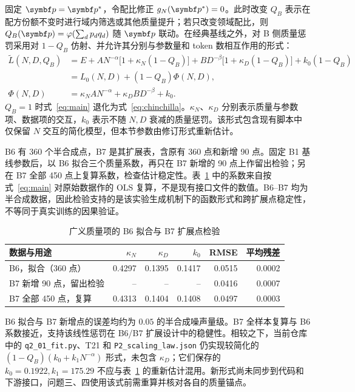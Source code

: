 固定 $\bp=\bp^*$，令配比修正 $g_N(\bp^*)=0$。此时改变 $Q_B$ 表示在配方份额不变时进行域内筛选或其他质量提升；若只改变领域配比，则 $Q_B(\bp)=\varphi(\sum_dp_dq_d)$ 随 $\bp$ 联动。在经典基线之外，对 B 侧质量惩罚采用对 $1-Q_B$ 仿射、并允许其分别与参数量和 token 数相互作用的形式：
\begin{equation}
\boxed{
\begin{aligned}
\widetilde L(N,D,Q_B)
&=E+AN^{-\alpha}\bigl[1+\kappa_N(1-Q_B)\bigr]
 +BD^{-\beta}\bigl[1+\kappa_D(1-Q_B)\bigr]+k_0(1-Q_B)\\
&=L_0(N,D)+(1-Q_B)\Phi(N,D),\\
\Phi(N,D)&=\kappa_NAN^{-\alpha}+\kappa_DBD^{-\beta}+k_0.
\end{aligned}}
\label{eq:main}
\end{equation}
$Q_B=1$ 时式~\eqref{eq:main} 退化为式~\eqref{eq:chinchilla}。$\kappa_N$、$\kappa_D$ 分别表示质量与参数项、数据项的交互，$k_0$ 表示不随 $N,D$ 衰减的质量惩罚。该形式包含现有脚本中仅保留 $N$ 交互的简化模型，但本节参数由修订形式重新估计。

B6 有 360 个半合成点，B7 是其扩展表，含原有 360 点和新增 90 点。固定 B1 基线参数后，以 B6 拟合三个质量系数，再只在 B7 新增的 90 点上作留出检验；另在 B7 全部 450 点上复算系数，检查估计稳定性。表~\ref{tab:q2_general_fit} 中的系数来自按式~\eqref{eq:main} 对原始数据作的 OLS 复算，不是现有接口文件的数值。B6--B7 均为半合成数据，因此检验支持的是该实验生成机制下的函数形式和跨扩展点稳定性，不等同于真实训练的因果验证。

\begin{table}[H]
\centering\small
\caption{广义质量项的 B6 拟合与 B7 扩展点检验}
\label{tab:q2_general_fit}
\begin{tabular}{lrrrrr}
\toprule
数据与用途 & $\kappa_N$ & $\kappa_D$ & $k_0$ & RMSE & 平均残差\\
\midrule
B6，拟合（360 点） & 0.4297 & 0.1395 & 0.1417 & 0.0515 & 0.0002\\
B7 新增 90 点，留出检验 & -- & -- & -- & 0.0416 & 0.0007\\
B7 全部 450 点，复算 & 0.4313 & 0.1404 & 0.1408 & 0.0497 & 0.0003\\
\bottomrule
\end{tabular}
\end{table}

B6 拟合与 B7 新增点的误差均约为 $0.05$ 的半合成噪声量级。B7 全样本复算与 B6 系数接近，支持该线性惩罚在 B6/B7 扩展设计中的稳健性。相较之下，当前仓库中的 \texttt{q2\_01\_fit.py}、T21 和 \texttt{P2\_scaling\_law.json} 仍实现较简化的 $(1-Q_B)(k_0+k_1N^{-\alpha})$ 形式，未包含 $\kappa_D$；它们保存的 $k_0=0.1922,k_1=175.29$ 不应与表~\ref{tab:q2_general_fit} 的重新估计混用。新形式尚未同步到代码和下游接口，问题三、四使用该式前需重算并核对各自的质量锚点。

